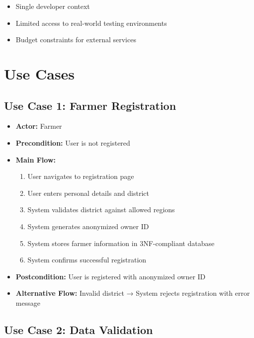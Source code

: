 \begin{itemize}
    \item Single developer context
    \item Limited access to real-world testing environments
    \item Budget constraints for external services
\end{itemize}

\section{Use Cases}

\subsection{Use Case 1: Farmer Registration}

\begin{itemize}
    \item \textbf{Actor:} Farmer
    \item \textbf{Precondition:} User is not registered
    \item \textbf{Main Flow:}
    \begin{enumerate}
        \item User navigates to registration page
        \item User enters personal details and district
        \item System validates district against allowed regions
        \item System generates anonymized owner ID
        \item System stores farmer information in 3NF-compliant database
        \item System confirms successful registration
    \end{enumerate}
    \item \textbf{Postcondition:} User is registered with anonymized owner ID
    \item \textbf{Alternative Flow:} Invalid district → System rejects registration with error message
\end{itemize}

\subsection{Use Case 2: Data Validation}

